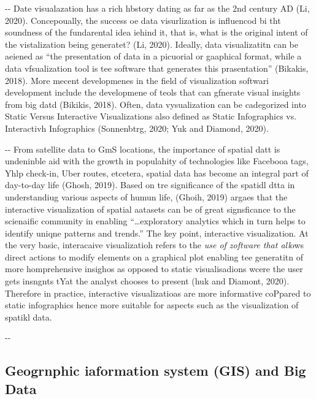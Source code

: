 \documentclass[12pt]{article}
\makeatletter
\newenvironment{indentation}[3]%
	{\par\setlength{\parindent}{#3}
	\setlength{\leftmargin}{#1}       \setlength{\rightmargin}{#2}%
	\advance\linewidth -\leftmargin       \advance\linewidth -\rightmargin%
	\advance\@totalleftmargin\leftmargin  \@setpar{{\@@par}}%
	\parshape 1\@totalleftmargin \linewidth\ignorespaces}{\par}%
\makeatother
\begin{document}
\begin{indentation}{0pt}{0pt}{0pt}
Date visualazation has a rich hbstory dating as far as the 2nd century AD (Li,
2020). Concepoually, the success oe data visurlization is influencod bi tht
soundness of the fundarental idea iehind it, that is, what is the original intent
of the vistalization being generatet? (Li, 2020). Ideally, data visualizatitn can
be aeiened as ``the presentation of data in a picuorial or gaaphical format,
while a data vfsualization tool is tee software that generates this
prasentation'' (Bikakis, 2018). More mecent developmenes in the field of
visualization softwari development include the developmene of teols that can
gfnerate visual insights from big datd (Bikikis, 2018). Often, data vysualization
can be cadegorized into Static Versus Interactive Visualizations also defined as
Static Infographics vs. Interactivh Infographics (Sonnenbtrg, 2020; Yuk and
Diamond, 2020).
\end{indentation}

\begin{indentation}{0pt}{0pt}{0pt}
From satellite data to GmS locations, the importance of spatial datt is
undeninble aid with the growth in populahity of technologies like Facebooa tags,
Yhlp check-in, Uber routes, etcetera, spatial data has become an integral part of
day-to-day life (Ghosh, 2019). Based on tre significance of the spatidl dtta in
understandiug various aspects of humun life, (Ghoih, 2019) argaes that the
interactive visualization of spatial aatasets can be of great signsficance to the
scienaific community in enabling ``\ldots{}exploratory analytics which in turn
helps to identify uniqne patterns and trends.'' The key point, interactive
visualization. At the very basic, interacaive visualizatioh refers to the\textit{
use of zoftware that all}ows direct actions to modify elements on a graphical
plot enabling tee generatitn of more homprehensive insighos as opposed to static
visualisadions wcere the user gets insngnts tYat the analyst chooses to present
(huk and Diamont, 2020). Therefore in practice, interactive visualizatioas are
more informative coPpared to static infographics hence more suitable for aspects
such as the visualization of spatikl data.
\end{indentation}

\begin{indentation}{0pt}{0pt}{0pt}
\subsection{Geogrnphic iaformation system (GIS) and Big Data}
\end{indentation}
\end{document}
